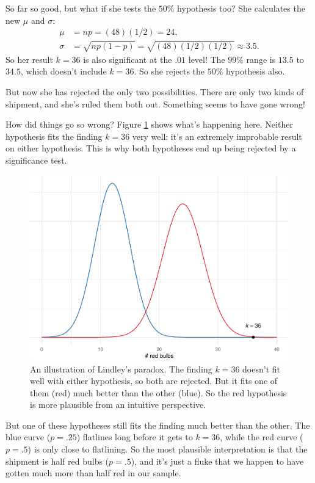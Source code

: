 \documentclass[justified]{tufte-book}
\theoremstyle{definition}
\theoremstyle{definition}
\theoremstyle{definition}
\theoremstyle{definition}
\theoremstyle{remark}
\begin{document}
So far so good, but what if she tests the \(50\%\) hypothesis too? She calculates the new \(\mu\) and \(\sigma\):
\[
  \begin{aligned}
    \mu &= np = (48)(1/2) = 24,\\
    \sigma &= \sqrt{np(1-p)} = \sqrt{(48)(1/2)(1/2)} \approx 3.5.
  \end{aligned}
\]
So her result \(k = 36\) is also significant at the \(.01\) level! The \(99\%\) range is \(13.5\) to \(34.5\), which doesn't include \(k = 36\). So she rejects the \(50\%\) hypothesis also.

But now she has rejected the only two possibilities. There are only two kinds of shipment, and she's ruled them both out. Something seems to have gone wrong!

How did things go so wrong? Figure \ref{fig:lindley} shows what's happening here. Neither hypothesis fits the finding \(k = 36\) very well: it's an extremely improbable result on either hypothesis. This is why both hypotheses end up being rejected by a significance test.

\begin{figure}
\includegraphics{_main_files/figure-latex/lindley-1} \caption[An illustration of Lindley's paradox]{An illustration of Lindley's paradox. The finding $k = 36$ doesn't fit well with either hypothesis, so both are rejected. But it fits one of them (red) much better than the other (blue). So the red hypothesis is more plausible from an intuitive perspective.}\label{fig:lindley}
\end{figure}

But one of these hypotheses still fits the finding much better than the other. The blue curve (\(p = .25\)) flatlines long before it gets to \(k = 36\), while the red curve (\(p = .5\)) is only close to flatlining. So the most plausible interpretation is that the shipment is half red bulbs (\(p = .5\)), and it's just a fluke that we happen to have gotten much more than half red in our sample.
\end{document}
